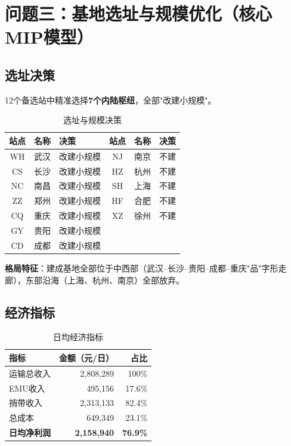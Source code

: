 \documentclass[12pt,a4paper,fontset=none]{ctexart}
\begin{document}
\section{问题三：基地选址与规模优化（核心MIP模型）}

\subsection{选址决策}
12个备选站中精准选择\textbf{7个内陆枢纽}，全部"改建小规模"。

\begin{table}[H]\centering\small
\caption{选址与规模决策}\label{tab:loc}
\begin{tabular}{ccl|ccl}
\toprule
站点 & 名称 & 决策 & 站点 & 名称 & 决策 \\
\midrule
WH & 武汉 & \cellcolor{green!15}改建小规模 & NJ & 南京 & \cellcolor{red!10}不建 \\
CS & 长沙 & \cellcolor{green!15}改建小规模 & HZ & 杭州 & \cellcolor{red!10}不建 \\
NC & 南昌 & \cellcolor{green!15}改建小规模 & SH & 上海 & \cellcolor{red!10}不建 \\
ZZ & 郑州 & \cellcolor{green!15}改建小规模 & HF & 合肥 & \cellcolor{red!10}不建 \\
CQ & 重庆 & \cellcolor{green!15}改建小规模 & XZ & 徐州 & \cellcolor{red!10}不建 \\
GY & 贵阳 & \cellcolor{green!15}改建小规模 & & & \\
CD & 成都 & \cellcolor{green!15}改建小规模 & & & \\
\bottomrule
\end{tabular}
\end{table}

\textbf{格局特征}：建成基地全部位于中西部（武汉--长沙--贵阳--成都--重庆"品"字形走廊），东部沿海（上海、杭州、南京）全部放弃。

\subsection{经济指标}

\begin{table}[H]\centering\small
\caption{日均经济指标}\label{tab:econ}
\begin{tabular}{lrr}
\toprule
指标 & 金额（元/日） & 占比 \\
\midrule
运输总收入 & 2,808,289 & 100\% \\
\quad EMU收入 & 495,156 & 17.6\% \\
\quad 捎带收入 & 2,313,133 & 82.4\% \\
\midrule
总成本 & 649,349 & 23.1\% \\
\rowcolor{green!5}
\textbf{日均净利润} & \textbf{2,158,940} & \textbf{76.9\%} \\
\bottomrule
\end{tabular}
\end{table}
\end{document}
